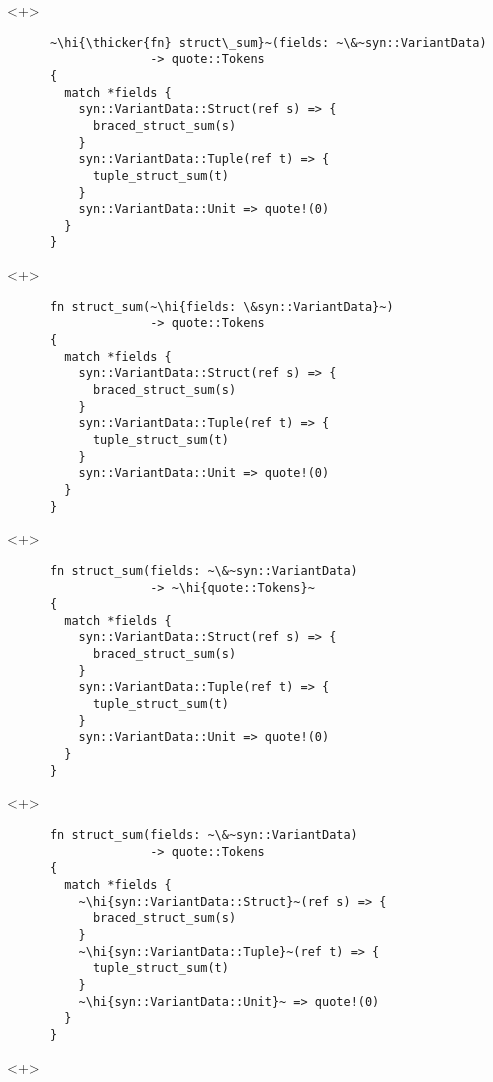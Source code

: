 \documentclass[usepdftitle=false]{beamer}
\renewcommand{\&}{\makebox[\widthof{\ampersand}][c]{\scalebox{0.9}[1.0]{\Book\ampersand}}}
\newcommand{\+}{\makebox[\widthof{+}][c]{\raisebox{-.2\height}{\scalefont{1.5}\Light+}}}
\newcommand{\thicker}[1]{\contourlength{0.26pt}\contour[10]{black}{#1}}
\newcommand{\hi}[1]{%
\tikz[baseline=(A.base)]
 \node[highlighting=0,inner sep=0pt,text depth=0pt] (A) {#1};%
}
\begin{document}
\begin{frame}[fragile]
  \begin{onlyenv}<+>
    \begin{verbatim}
      ~\hi{\thicker{fn} struct\_sum}~(fields: ~\&~syn::VariantData)
                    -> quote::Tokens
      {
        match *fields {
          syn::VariantData::Struct(ref s) => {
            braced_struct_sum(s)
          }
          syn::VariantData::Tuple(ref t) => {
            tuple_struct_sum(t)
          }
          syn::VariantData::Unit => quote!(0)
        }
      }
    \end{verbatim}
  \end{onlyenv}
  \begin{onlyenv}<+>
    \begin{verbatim}
      fn struct_sum(~\hi{fields: \&syn::VariantData}~)
                    -> quote::Tokens
      {
        match *fields {
          syn::VariantData::Struct(ref s) => {
            braced_struct_sum(s)
          }
          syn::VariantData::Tuple(ref t) => {
            tuple_struct_sum(t)
          }
          syn::VariantData::Unit => quote!(0)
        }
      }
    \end{verbatim}
  \end{onlyenv}
  \begin{onlyenv}<+>
    \begin{verbatim}
      fn struct_sum(fields: ~\&~syn::VariantData)
                    -> ~\hi{quote::Tokens}~
      {
        match *fields {
          syn::VariantData::Struct(ref s) => {
            braced_struct_sum(s)
          }
          syn::VariantData::Tuple(ref t) => {
            tuple_struct_sum(t)
          }
          syn::VariantData::Unit => quote!(0)
        }
      }
    \end{verbatim}
  \end{onlyenv}
  \begin{onlyenv}<+>
    \begin{verbatim}
      fn struct_sum(fields: ~\&~syn::VariantData)
                    -> quote::Tokens
      {
        match *fields {
          ~\hi{syn::VariantData::Struct}~(ref s) => {
            braced_struct_sum(s)
          }
          ~\hi{syn::VariantData::Tuple}~(ref t) => {
            tuple_struct_sum(t)
          }
          ~\hi{syn::VariantData::Unit}~ => quote!(0)
        }
      }
    \end{verbatim}
  \end{onlyenv}
  \begin{onlyenv}<+>
    \begin{verbatim}

\end{verbatim}
\end{onlyenv}
\end{frame}
\end{document}
